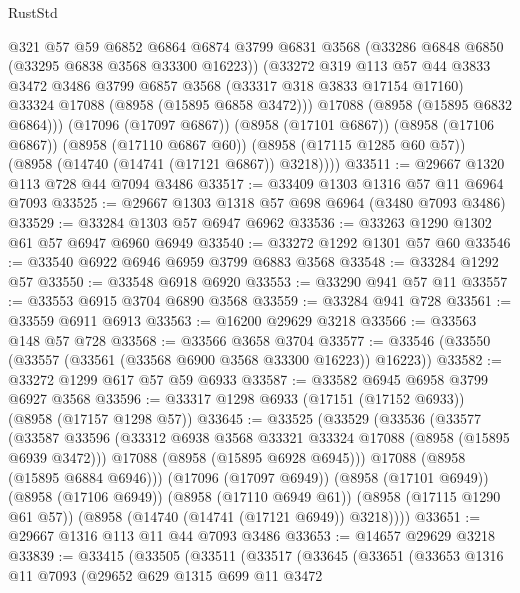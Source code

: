 \begin{lexlean}{RustStd}
\begin{coremodule}
          @321
          @57
          @59
          @6852
          @6864
          @6874
          @3799
          @6831
          @3568
          (@33286 @6848 @6850 (@33295 @6838 @3568 @33300 @16223))
          (@33272
            @319
            @113
            @57
            @44
            @3833
            @3472
            @3486
            @3799
            @6857
            @3568
            (@33317 @318 @3833 @17154 @17160)
            @33324
            @17088
            (@8958 (@15895 @6858 @3472)))
          @17088
          (@8958 (@15895 @6832 @6864)))
        (@17096 (@17097 @6867))
        (@8958 (@17101 @6867))
        (@8958 (@17106 @6867))
        (@8958 (@17110 @6867 @60))
        (@8958 (@17115 @1285 @60 @57))
        (@8958 (@14740 (@14741 (@17121 @6867)) @3218))))
@33511 := @29667 @1320 @113 @728 @44 @7094 @3486
@33517 := @33409 @1303 @1316 @57 @11 @6964 @7093
@33525 := @29667 @1303 @1318 @57 @698 @6964 (@3480 @7093 @3486)
@33529 := @33284 @1303 @57 @6947 @6962
@33536 := @33263 @1290 @1302 @61 @57 @6947 @6960 @6949
@33540 := @33272 @1292 @1301 @57 @60
@33546 := @33540 @6922 @6946 @6959 @3799 @6883 @3568
@33548 := @33284 @1292 @57
@33550 := @33548 @6918 @6920
@33553 := @33290 @941 @57 @11
@33557 := @33553 @6915 @3704 @6890 @3568
@33559 := @33284 @941 @728
@33561 := @33559 @6911 @6913
@33563 := @16200 @29629 @3218
@33566 := @33563 @148 @57 @728
@33568 := @33566 @3658 @3704
@33577 := @33546 (@33550 (@33557 (@33561 (@33568 @6900 @3568 @33300 @16223)) @16223))
@33582 := @33272 @1299 @617 @57 @59 @6933
@33587 := @33582 @6945 @6958 @3799 @6927 @3568
@33596 := @33317 @1298 @6933 (@17151 (@17152 @6933)) (@8958 (@17157 @1298 @57))
@33645 := @33525
    (@33529
      (@33536
        (@33577
          (@33587
            @33596
            (@33312 @6938 @3568 @33321 @33324 @17088 (@8958 (@15895 @6939 @3472)))
            @17088
            (@8958 (@15895 @6928 @6945)))
          @17088
          (@8958 (@15895 @6884 @6946)))
        (@17096 (@17097 @6949))
        (@8958 (@17101 @6949))
        (@8958 (@17106 @6949))
        (@8958 (@17110 @6949 @61))
        (@8958 (@17115 @1290 @61 @57))
        (@8958 (@14740 (@14741 (@17121 @6949)) @3218))))
@33651 := @29667 @1316 @113 @11 @44 @7093 @3486
@33653 := @14657 @29629 @3218
@33839 := @33415
    (@33505
      (@33511
        (@33517
          (@33645
            (@33651
              (@33653
                @1316
                @11
                @7093
                (@29652
                  @629
                  @1315
                  @699
                  @11
                  @3472

\end{coremodule}
\end{lexlean}
